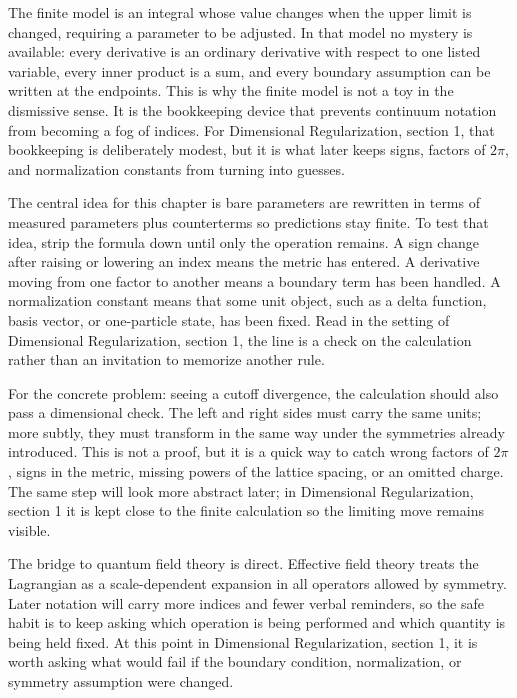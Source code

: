 The finite model is an integral whose value changes when the upper limit is changed, requiring a parameter to be adjusted.  In that model no mystery is available: every derivative is an ordinary derivative with respect to one listed variable, every inner product is a sum, and every boundary assumption can be written at the endpoints.  This is why the finite model is not a toy in the dismissive sense.  It is the bookkeeping device that prevents continuum notation from becoming a fog of indices.  For Dimensional Regularization, section 1, that bookkeeping is deliberately modest, but it is what later keeps signs, factors of \(2\pi\), and normalization constants from turning into guesses.

The central idea for this chapter is bare parameters are rewritten in terms of measured parameters plus counterterms so predictions stay finite.  To test that idea, strip the formula down until only the operation remains.  A sign change after raising or lowering an index means the metric has entered.  A derivative moving from one factor to another means a boundary term has been handled.  A normalization constant means that some unit object, such as a delta function, basis vector, or one-particle state, has been fixed.  Read in the setting of Dimensional Regularization, section 1, the line is a check on the calculation rather than an invitation to memorize another rule.

For the concrete problem: seeing a cutoff divergence, the calculation should also pass a dimensional check.  The left and right sides must carry the same units; more subtly, they must transform in the same way under the symmetries already introduced.  This is not a proof, but it is a quick way to catch wrong factors of \(2\pi\), signs in the metric, missing powers of the lattice spacing, or an omitted charge.  The same step will look more abstract later; in Dimensional Regularization, section 1 it is kept close to the finite calculation so the limiting move remains visible.

The bridge to quantum field theory is direct.  Effective field theory treats the Lagrangian as a scale-dependent expansion in all operators allowed by symmetry.  Later notation will carry more indices and fewer verbal reminders, so the safe habit is to keep asking which operation is being performed and which quantity is being held fixed.  At this point in Dimensional Regularization, section 1, it is worth asking what would fail if the boundary condition, normalization, or symmetry assumption were changed.

